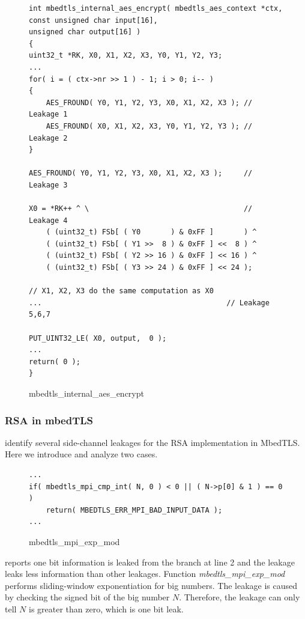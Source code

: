 \begin{figure}[h!]
    \centering
\begin{lstlisting}[xleftmargin=.02\textwidth,xrightmargin=.01\textwidth]
int mbedtls_internal_aes_encrypt( mbedtls_aes_context *ctx,
const unsigned char input[16],
unsigned char output[16] )
{
uint32_t *RK, X0, X1, X2, X3, Y0, Y1, Y2, Y3;
...
for( i = ( ctx->nr >> 1 ) - 1; i > 0; i-- )
{
    AES_FROUND( Y0, Y1, Y2, Y3, X0, X1, X2, X3 ); // Leakage 1
    AES_FROUND( X0, X1, X2, X3, Y0, Y1, Y2, Y3 ); // Leakage 2
}

AES_FROUND( Y0, Y1, Y2, Y3, X0, X1, X2, X3 );     // Leakage 3

X0 = *RK++ ^ \                                    // Leakage 4
    ( (uint32_t) FSb[ ( Y0       ) & 0xFF ]       ) ^
    ( (uint32_t) FSb[ ( Y1 >>  8 ) & 0xFF ] <<  8 ) ^
    ( (uint32_t) FSb[ ( Y2 >> 16 ) & 0xFF ] << 16 ) ^
    ( (uint32_t) FSb[ ( Y3 >> 24 ) & 0xFF ] << 24 );

// X1, X2, X3 do the same computation as X0
...                                           // Leakage 5,6,7

PUT_UINT32_LE( X0, output,  0 );
...
return( 0 );
}
\end{lstlisting}
\caption{mbedtls\_internal\_aes\_encrypt}
\label{mbedtls_aes}
\end{figure}

\subsubsection{RSA in mbedTLS}
\tool{} identify several side-channel leakages for the RSA implementation
in MbedTLS. Here we introduce and analyze two cases. 

\begin{figure}[h!]
    \centering
\begin{lstlisting}[xleftmargin=.02\textwidth,xrightmargin=.01\textwidth]
...
if( mbedtls_mpi_cmp_int( N, 0 ) < 0 || ( N->p[0] & 1 ) == 0 )
    return( MBEDTLS_ERR_MPI_BAD_INPUT_DATA );
...
\end{lstlisting}
\caption{mbedtls\_mpi\_exp\_mod}
\label{mbedtls_rsa_1}
\end{figure}

\tool{} reports one bit information is leaked from the branch at line 2 and
the leakage leaks less information than other leakages.
Function \emph{mbedtls\_mpi\_exp\_mod} performs sliding-window exponentiation for
big numbers. 
The leakage is caused by checking the signed bit of the big number $N$. 
Therefore, the leakage can only tell $N$ is greater than zero, which is one
bit leak.


